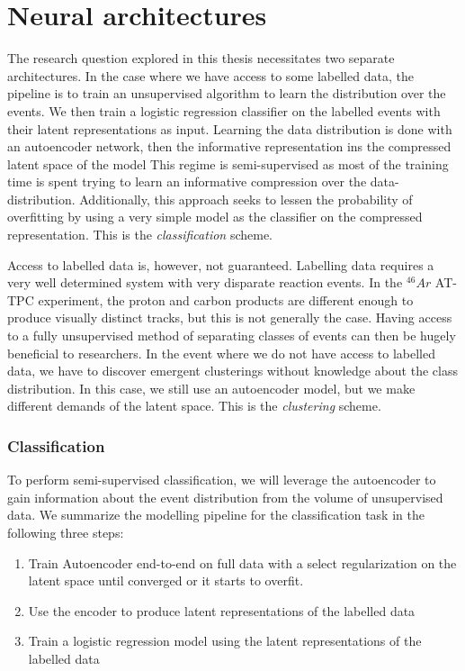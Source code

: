 
\chapter{Neural architectures}\label{ch:architectures}

The research question explored in this thesis necessitates two separate architectures. In the case where we have access to some labelled data, the pipeline is to train an unsupervised algorithm to learn the distribution over the events. We then train a logistic regression classifier on the labelled events with their latent representations as input. Learning the data distribution is done with an autoencoder network, then the informative representation ins the compressed latent space of the model This regime is semi-supervised as most of the training time is spent trying to learn an informative compression over the data-distribution. Additionally, this approach seeks to lessen the probability of overfitting by using a very simple model as the classifier on the compressed representation. This is the \textit{classification} scheme.

 Access to labelled data is, however, not guaranteed. Labelling data requires a very well determined system with very disparate reaction events. In the ${}^{46}Ar$ AT-TPC experiment, the proton and carbon products are different enough to produce visually distinct tracks, but this is not generally the case. Having access to a fully unsupervised method of separating classes of events can then be hugely beneficial to researchers. In the event where we do not have access to labelled data, we have to discover emergent clusterings without knowledge about the class distribution. In this case, we still use an autoencoder model, but we make different demands of the latent space. This is the \textit{clustering} scheme. 

\subsection{Classification}
To perform semi-supervised classification, we will leverage the autoencoder to gain information about the event distribution from the volume of unsupervised data. We summarize the modelling pipeline for the classification task in the following three steps: 

\begin{enumerate}
\item Train Autoencoder end-to-end on full data with a select regularization on the latent space until converged or it starts to overfit. 
\item Use the encoder to produce latent representations of the labelled data 
\item Train a logistic regression model using the latent representations of the labelled data 
\end{enumerate}

